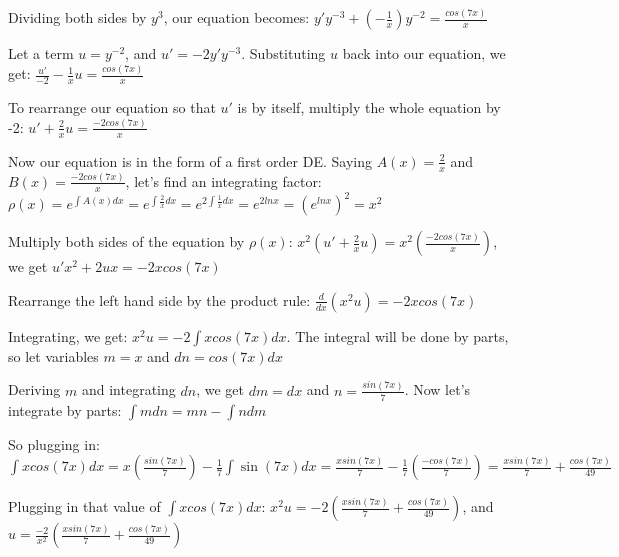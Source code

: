 \documentclass{article}
\begin{document}
\noindent Dividing both sides by $y^{3}$, our equation becomes: $y'y^{-3} + (-\frac{1}{x})y^{-2} = \frac{cos(7x)}{x}$ \par\vspace{0.25cm}

\noindent Let a term $u = y^{-2}$, and $u' = -2y'y^{-3}$.  Substituting $u$ back into our equation, we get: $\frac{u'}{-2} - \frac{1}{x}u = \frac{cos(7x)}{x}$\par
\noindent To rearrange our equation so that $u'$ is by itself, multiply the whole equation by -2: $u' + \frac{2}{x}u = \frac{-2cos(7x)}{x}$  \par\vspace{0.25cm}

\noindent Now our equation is in the form of a first order DE.  Saying $A(x) = \frac{2}{x}$ and $B(x) = \frac{-2cos(7x)}{x}$, let's find an integrating factor: $\rho(x) = e^{\int A(x)dx} = e^{\int \frac{2}{x} dx} = e^{2\int \frac{1}{x} dx} = e^{2lnx} = (e^{lnx})^{2} = x^{2}$ \par\vspace{0.25cm}

\noindent Multiply both sides of the equation by $\rho(x)$: $x^{2}(u' + \frac{2}{x}u) = x^{2}(\frac{-2cos(7x)}{x})$, we get $u'x^{2} + 2ux = -2xcos(7x)$ \par
\noindent Rearrange the left hand side by the product rule: $\frac{d}{dx}(x^{2}u) = -2xcos(7x)$ \par\vspace{0.25cm}

\noindent Integrating, we get: $x^{2}u = -2\int xcos(7x) dx$.  The integral will be done by parts, so let variables $m = x$ and $dn = cos(7x)dx$ \par
\noindent Deriving $m$ and integrating $dn$, we get $dm = dx$ and $n = \frac{sin(7x)}{7}$.  Now let's integrate by parts: $\int m dn = mn - \int n dm$ \par\vspace{0.25cm}

\noindent So plugging in: $\int xcos(7x) dx = x(\frac{sin(7x)}{7}) - \frac{1}{7}\int \sin(7x) dx = \frac{xsin(7x)}{7} - \frac{1}{7} (\frac{-cos(7x)}{7}) = \frac{xsin(7x)}{7} + \frac{cos(7x)}{49}$ \par\vspace{0.25cm}

\noindent Plugging in that value of $\int xcos(7x)dx$: $x^{2}u = -2(\frac{xsin(7x)}{7} + \frac{cos(7x)}{49})$, and $u = \frac{-2}{x^{2}}(\frac{xsin(7x)}{7} + \frac{cos(7x)}{49})$ \par\vspace{0.25cm}
\end{document}
